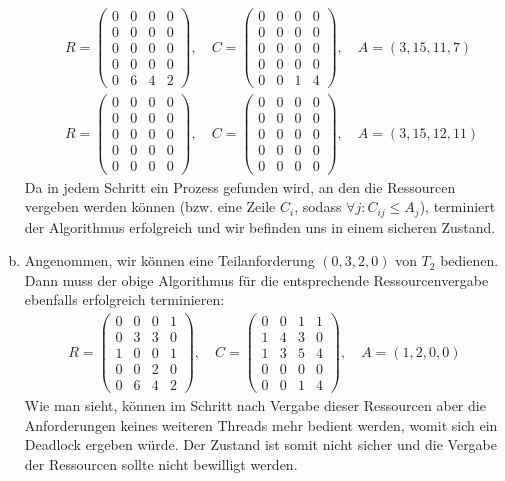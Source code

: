 \documentclass[numbers=noendperiod]{scrartcl}
\begin{document}
\begin{enumerate}[a)]
\begin{align}
		&R = \begin{pmatrix}
		0 & 0 & 0 & 0\\
		0 & 0 & 0 & 0\\
		0 & 0 & 0 & 0\\
		0 & 0 & 0 & 0\\
		0 & 6 & 4 & 2
		\end{pmatrix},\quad C = \begin{pmatrix}
		0 & 0 & 0 & 0\\
		0 & 0 & 0 & 0\\
		0 & 0 & 0 & 0\\
		0 & 0 & 0 & 0\\
		0 & 0 & 1 & 4
		\end{pmatrix}, \quad A = (3,15,11,7)\\\
		&R = \begin{pmatrix}
		0 & 0 & 0 & 0\\
		0 & 0 & 0 & 0\\
		0 & 0 & 0 & 0\\
		0 & 0 & 0 & 0\\
		0 & 0 & 0 & 0
		\end{pmatrix},\quad C = \begin{pmatrix}
		0 & 0 & 0 & 0\\
		0 & 0 & 0 & 0\\
		0 & 0 & 0 & 0\\
		0 & 0 & 0 & 0\\
		0 & 0 & 0 & 0
		\end{pmatrix}, \quad A = (3,15,12,11)
	\end{align}
	Da in jedem Schritt ein Prozess gefunden wird, an den die Ressourcen vergeben werden können (bzw. eine Zeile $C_i$, sodass $\forall j: C_{ij} \le A_j$), terminiert der Algorithmus erfolgreich und wir befinden uns in einem sicheren Zustand.
	
	\item Angenommen, wir können eine Teilanforderung $(0,3,2,0)$ von $T_2$ bedienen. Dann muss der obige Algorithmus für die entsprechende Ressourcenvergabe ebenfalls erfolgreich terminieren:
	\begin{align}
		R = \begin{pmatrix}
		0 & 0 & 0 & 1\\
		0 & 3 & 3 & 0\\
		1 & 0 & 0 & 1\\
		0 & 0 & 2 & 0\\
		0 & 6 & 4 & 2
		\end{pmatrix}, \quad
		C = \begin{pmatrix}
		0 & 0 & 1 & 1\\
		1 & 4 & 3 & 0\\
		1 & 3 & 5 & 4\\
		0 & 0 & 0 & 0\\
		0 & 0 & 1 & 4
		\end{pmatrix},\quad A = (1,2,0,0)
	\end{align}
	Wie man sieht, können im Schritt nach Vergabe dieser Ressourcen aber die Anforderungen keines weiteren Threads mehr bedient werden, womit sich ein Deadlock ergeben würde. Der Zustand ist somit nicht sicher und die Vergabe der Ressourcen sollte nicht bewilligt werden.
\end{enumerate}
\end{document}
